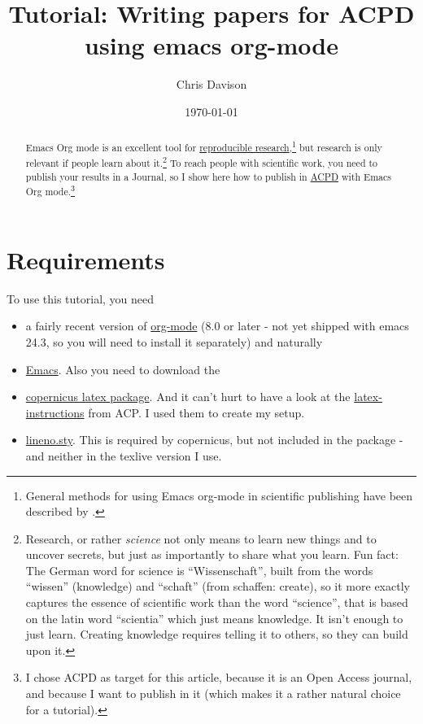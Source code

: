 \documentclass[11pt]{article}
\author{Chris Davison}
\date{\today}
\title{Tutorial: Writing papers for ACPD using emacs org-mode}
\begin{document}
\maketitle
{}

\begin{abstract}
Emacs Org mode is an excellent tool for \href{http://www.jstatsoft.org/v46/i03/}{reproducible research},\footnote{General methods for using Emacs org-mode in scientific publishing have been described by \citet{SchulteEmacs2012}.} but research is only relevant if people learn about it.\footnote{Research, or rather \emph{science} not only means to learn new things and to uncover secrets, but just as importantly to share what you learn. Fun fact: The German word for science is “Wissenschaft”, built from the words “wissen” (knowledge) and “schaft” (from schaffen: create), so it more exactly captures the essence of scientific work than the word “science”, that is based on the latin word “scientia” which just means knowledge. It isn’t enough to just learn. Creating knowledge requires telling it to others, so they can build upon it.} To reach people with scientific work, you need to publish your results in a Journal, so I show here how to publish in \href{http://www.atmos-chem-phys-discuss.net/}{ACPD} with Emacs Org mode.\footnote{I chose ACPD as target for this article, because it is an Open Access journal, and because I want to publish in it (which makes it a rather natural choice for a tutorial).}
\end{abstract}

\setcounter{tocdepth}{2}
\tableofcontents

\section*{Requirements}
\label{sec-1}

To use this tutorial, you need 

\begin{itemize}
\item a fairly recent version of \href{http://orgmode.org}{org-mode} (8.0 or later - not yet shipped with emacs 24.3, so you will need to install it separately) and naturally
\item \href{http://gnu.org/s/emacs}{Emacs}. Also you need to download the
\item \href{http://www.atmospheric-chemistry-and-physics.net/Copernicus_LaTeX_Package_v_2_7.zip}{copernicus latex package}. And it can’t hurt to have a look at the \href{http://www.atmospheric-chemistry-and-physics.net/submission/latex_instructions.html}{latex-instructions} from ACP. I used them to create my setup.
\item \href{http://tug.ctan.org/tex-archive/macros/latex/contrib/lineno/lineno.sty}{lineno.sty}. This is required by copernicus, but not included in the package - and neither in the texlive version I use.
\end{itemize}
\end{document}
